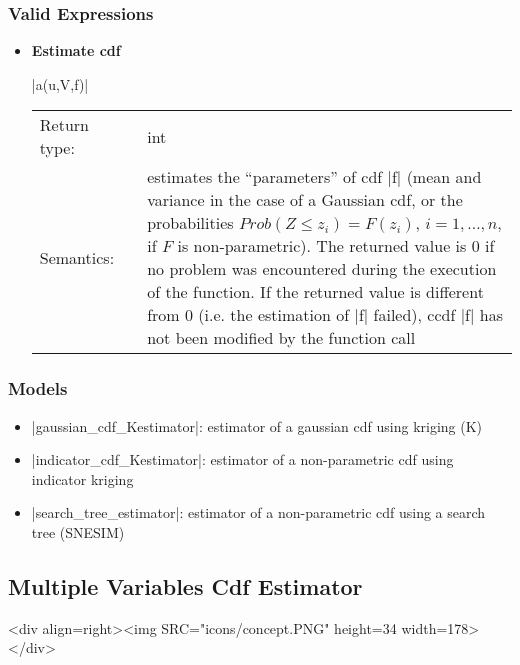 \documentclass[12pt,twoside]{report}
\begin{document}
\htmlrule[CLEAR=all]  \subsubsection*{Valid Expressions}
\begin{itemize}
\item {\bf Estimate cdf}

  |a(u,V,f)|

  \begin{tabular}[!h]{l p{1cm} p{10cm}}
    Return type: & & int\\
    Semantics: & & estimates the ``parameters'' of cdf |f| (mean and variance in the case of a Gaussian cdf, or the probabilities \mbox{$Prob(Z \le z_i)=F(z_i)$,} $i=1,\ldots,n$, if $F$ is non-parametric). The returned value is 0 if no problem was encountered during the execution of the function. If the returned value is different from 0 (i.e. the estimation of |f| failed), ccdf |f| has not been modified by the function call\\
    
  \end{tabular}

\end{itemize}

\htmlrule[CLEAR=all]  \subsubsection*{Models}
\begin{itemize}
\item |gaussian_cdf_Kestimator|: estimator of a gaussian cdf using kriging (K)
\item |indicator_cdf_Kestimator|: estimator of a non-parametric cdf using indicator kriging
\item |search_tree_estimator|: estimator of a non-parametric cdf using a search tree (SNESIM)
\end{itemize}








\subsection{Multiple Variables Cdf Estimator}
\label{concept:mvce}
\begin{htmlonly}
<div align=right><img SRC="icons/concept.PNG" height=34 width=178></div>
\end{htmlonly}
\end{document}
